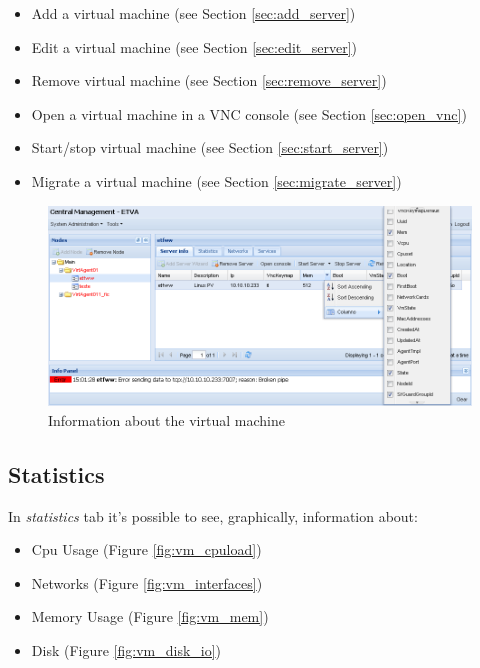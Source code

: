 \begin{itemize}
	\item Add a virtual machine (see Section \ref{sec:add_server})
    \item Edit a virtual machine (see Section \ref{sec:edit_server})
	\item Remove virtual machine (see Section \ref{sec:remove_server})
	\item Open a virtual machine in a VNC console (see Section \ref{sec:open_vnc})
	\item Start/stop virtual machine (see Section \ref{sec:start_server})
    \item Migrate a virtual machine (see Section \ref{sec:migrate_server})
\end{itemize}

\begin{figure}[H]
	\begin{center}
	\includegraphics[scale=0.45]{screenshots/server_info.png}
	\caption{Information about the virtual machine}
	\label{fig:server_info}
	\end{center}
\end{figure}

\subsection{Statistics}
In \emph{statistics} tab it's possible to see, graphically, information about:
\begin{itemize}
	\item Cpu Usage (Figure \ref{fig:vm_cpuload})
	\item Networks (Figure \ref{fig:vm_interfaces})
	\item Memory Usage (Figure \ref{fig:vm_mem})
	\item Disk (Figure \ref{fig:vm_disk_io})
\end{itemize}


